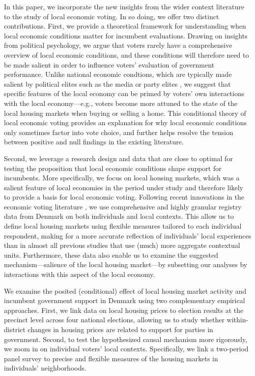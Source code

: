\documentclass[12pt,a4paper]{article}
\begin{document}
	
	In this paper, we incorporate the new insights from the wider context literature to the study of local economic voting. In so doing, we offer two distinct contributions. First, we provide a theoretical framework for understanding when local economic conditions matter for incumbent evaluations. Drawing on insights from political psychology, we argue that voters rarely have a comprehensive overview of local economic conditions, and these conditions will therefore need to be made salient in order to influence voters’ evaluation of government performance. Unlike national economic condtions, which are typically made salient by political elites such as the media \citep{hart2013can} or party elites \citep{bisgaard2017partisan}, we suggest that specific features of the local economy can be primed by voters’ own interactions with the local economy—e.g., voters become more attuned to the state of the local housing markets when buying or selling a home. This conditional theory of local economic voting provides an explanation for why local economic conditions only sometimes factor into vote choice, and further helps resolve the tension between positive and null findings in the existing literature.
	
	Second, we leverage a research design and data that are close to optimal for testing the proposition that local economic conditions shape support for incumbents. More specifically, we focus on local housing markets, which was a salient feature of local economies in the period under study and therefore likely to provide a basis for local economic voting. Following recent innovations in the economic voting literature \citep{healy2017digging}, we use comprehensive and highly granular registry data from Denmark on both individuals and local contexts. This allow us to define local housing markets using flexible measures tailored to each individual respondent, making for a more accurate reflection of individuals’ local experiences than in almost all previous studies that use (much) more aggregate contextual units. Furthermore, these data also enable us to examine the suggested mechanism—salience of the local housing market—by subsetting our analyses by interactions with this aspect of the local economy.  
	
	We examine the posited (conditional) effect of local housing market activity and incumbent government support in Denmark using two complementary empirical approaches. First, we link data on local housing prices to election results at the precinct level across four national elections, allowing us to study whether within-district changes in housing prices are related to support for parties in government. Second, to test the hypothesized causal mechanism more rigorously, we zoom in on individual voters' local contexts. Specifically, we link a two-period panel survey to precise and flexible measures of the housing markets in individuals' neighborhoods.
	
\end{document}

